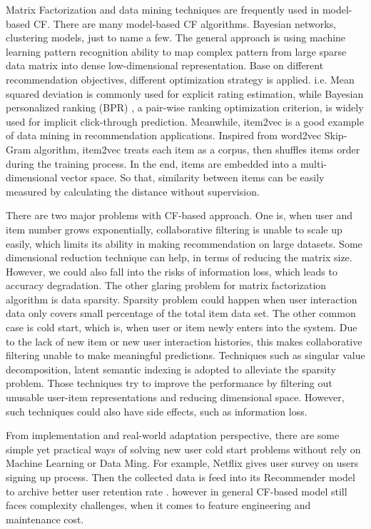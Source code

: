 Matrix Factorization and data mining techniques are frequently used in model-based CF. There are many model-based CF algorithms. Bayesian networks, clustering models, just to name a few. The general approach is using machine learning pattern recognition ability to map complex pattern from large sparse data matrix into dense low-dimensional representation. Base on different recommendation objectives, different optimization strategy is applied. i.e. Mean squared deviation is commonly used for explicit rating estimation, while Bayesian personalized ranking (BPR) \citep{rendle2012bpr}, a pair-wise ranking optimization criterion, is widely used for implicit click-through prediction.   
Meanwhile, item2vec \citep{barkan2016item2vec} is a good example of data mining in recommendation applications. Inspired from word2vec \citep{mikolov2013distributed} Skip-Gram algorithm, item2vec treats each item as a corpus, then shuffles items order during the training process. In the end, items are embedded into a multi-dimensional vector space. So that, similarity between items can be easily measured by calculating the distance without supervision.  

There are two major problems with CF-based approach.  
One is, when user and item number grows exponentially, collaborative filtering is unable to scale up easily, which limits its ability in making recommendation on large datasets. Some dimensional reduction technique can help, in terms of reducing the matrix size. However, we could also fall into the risks of information loss, which leads to accuracy degradation. 
The other glaring problem for matrix factorization algorithm is data sparsity. Sparsity problem could happen when user interaction data only covers small percentage of the total item data set. The other common case is cold start, which is, when user or item newly enters into the system. Due to the lack of new item or new user interaction histories, this makes collaborative filtering unable to make meaningful predictions.  
Techniques such as singular value decomposition, latent semantic indexing is adopted to alleviate the sparsity problem. Those techniques try to improve the performance by filtering out unusable user-item representations and reducing dimensional space. However, such techniques could also have side effects, such as information loss. 

From implementation and real-world adaptation perspective, there are some simple yet practical ways of solving new user cold start problems without rely on Machine Learning or Data Ming. For example, Netflix gives user survey on users signing up process. Then the collected data is feed into its Recommender model to archive better user retention rate \citep{gomez2015netflix}. however in general CF-based model still faces complexity challenges, when it comes to feature engineering and maintenance cost. 



